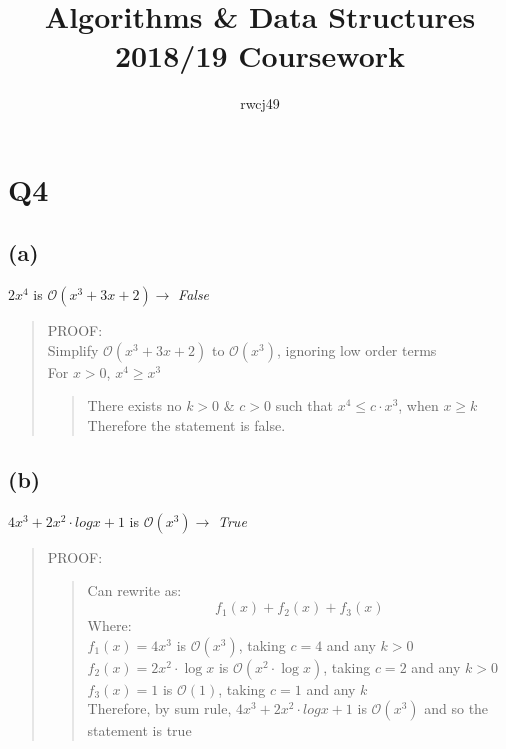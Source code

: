 \documentclass[12pt]{article}%
\title{Algorithms & Data Structures 2018/19 Coursework}
\author{rwcj49}
\date{  }
\begin{document}
\maketitle


\section*{Q4}
\subsection*{(a)}
$2x^4$ is $\mathcal{O}(x^3 + 3x +2) \xrightarrow{}$ \textit{False} \\
\bigskip
\begin{quote}
PROOF:\\

\skip
Simplify $\mathcal{O}(x^3 + 3x +2)$ to  $\mathcal{O}(x^3)$, ignoring low order terms\\

For $x > 0$,\hspace{10px} $x^4 \geq  x^3$
\begin{quote}
There exists no $k>0$ \& $c >0 $ such that $x^4 \leq c \cdot x^3$, when $x \geq k$ \\
Therefore the statement is false.

\end{quote}
\end{quote}




\subsection*{(b)}
$4x^3 +2x^2 \cdot logx + 1$ is $\mathcal{O}(x^3) \xrightarrow{}$ \textit{True} \\
\bigskip
\begin{quote}
PROOF:
\begin{quote}
Can rewrite as:
    $$f_1(x) + f_2(x) + f_3(x)$$
    Where:\\
    $f_1(x) = 4x^3$ is $\mathcal{O}(x^3)$, taking $c = 4$ and any $k > 0$\\
    $f_2(x) = 2x^2 \cdot \log x$ is $\mathcal{O}(x^2\cdot \log x)$, taking $c = 2$ and any $k > 0$\\
    $f_3(x) = 1$ is $\mathcal{O}(1)$, taking $c = 1$ and any $k$\\
    Therefore, by sum rule, $4x^3 +2x^2 \cdot logx + 1$ is $\mathcal{O}(x^3)$ and so the statement is true\\
\end{quote}
\end{quote}
\end{document}
